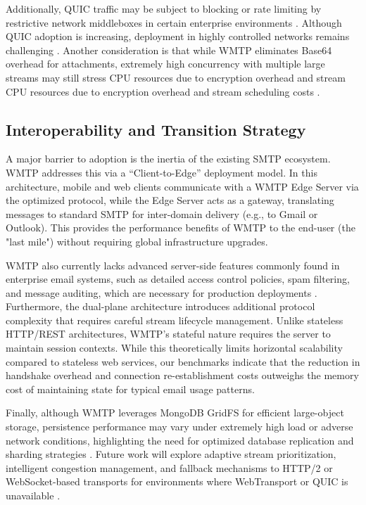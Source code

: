 \documentclass[10pt,a4paper]{article}
\begin{document}
Additionally, QUIC traffic may be subject to blocking or rate
limiting by restrictive network middleboxes in certain enterprise
environments \cite{quic}. Although QUIC adoption is
increasing, deployment in highly controlled networks remains
challenging \cite{http3}. Another consideration is that while
WMTP eliminates Base64 overhead for attachments, extremely
high concurrency with multiple large streams may still stress
CPU resources due to encryption overhead and stream
CPU resources due to encryption overhead and stream
scheduling costs \cite{quic, webtransport, tls13}.

\subsection{Interoperability and Transition Strategy}
A major barrier to adoption is the inertia of the existing SMTP ecosystem. WMTP addresses this via a ``Client-to-Edge'' deployment model. In this architecture, mobile and web clients communicate with a WMTP Edge Server via the optimized protocol, while the Edge Server acts as a gateway, translating messages to standard SMTP for inter-domain delivery (e.g., to Gmail or Outlook). This provides the performance benefits of WMTP to the end-user (the "last mile") without requiring global infrastructure upgrades.

WMTP also currently lacks advanced server-side features
commonly found in enterprise email systems, such as detailed
access control policies, spam filtering, and message auditing,
which are necessary for production deployments \cite{smtp, jmap}.
Furthermore, the dual-plane architecture introduces additional
protocol complexity that requires careful stream lifecycle
management. Unlike stateless HTTP/REST architectures, WMTP's stateful nature requires the server to maintain session contexts. While this theoretically limits horizontal scalability compared to stateless web services, our benchmarks indicate that the reduction in handshake overhead and connection re-establishment costs outweighs the memory cost of maintaining state for typical email usage patterns.

Finally, although WMTP leverages MongoDB GridFS for
efficient large-object storage, persistence performance may
vary under extremely high load or adverse network conditions,
highlighting the need for optimized database replication and
sharding strategies \cite{mongodb2024, gridfs2024}. Future work will
explore adaptive stream prioritization, intelligent congestion
management, and fallback mechanisms to HTTP/2 or
WebSocket-based transports for environments where
WebTransport or QUIC is unavailable \cite{http3, jmap}.
\vspace{12pt}
\end{document}
